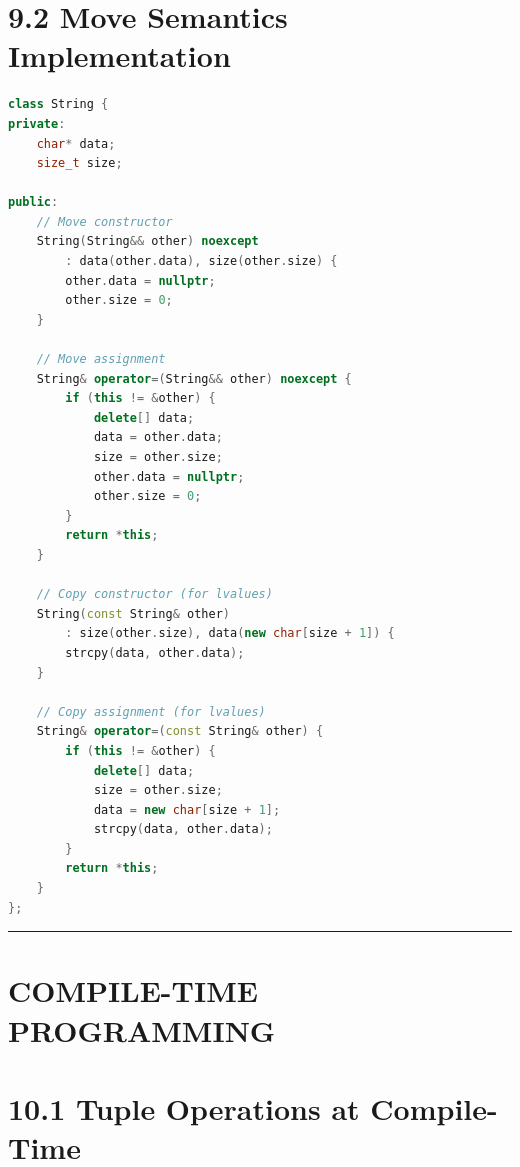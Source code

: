 \hypertarget{move-semantics-implementation}{%
\section{9.2 Move Semantics
Implementation}\label{move-semantics-implementation}}

\begin{lstlisting}[language={C++}]
class String {
private:
    char* data;
    size_t size;
    
public:
    // Move constructor
    String(String&& other) noexcept 
        : data(other.data), size(other.size) {
        other.data = nullptr;
        other.size = 0;
    }
    
    // Move assignment
    String& operator=(String&& other) noexcept {
        if (this != &other) {
            delete[] data;
            data = other.data;
            size = other.size;
            other.data = nullptr;
            other.size = 0;
        }
        return *this;
    }
    
    // Copy constructor (for lvalues)
    String(const String& other)
        : size(other.size), data(new char[size + 1]) {
        strcpy(data, other.data);
    }
    
    // Copy assignment (for lvalues)
    String& operator=(const String& other) {
        if (this != &other) {
            delete[] data;
            size = other.size;
            data = new char[size + 1];
            strcpy(data, other.data);
        }
        return *this;
    }
};
\end{lstlisting}

\begin{center}\rule{0.5\linewidth}{0.5pt}\end{center}

\hypertarget{compile-time-programming}{%
\section{COMPILE-TIME PROGRAMMING}\label{compile-time-programming}}

\hypertarget{tuple-operations-at-compile-time}{%
\section{10.1 Tuple Operations at
Compile-Time}\label{tuple-operations-at-compile-time}}

